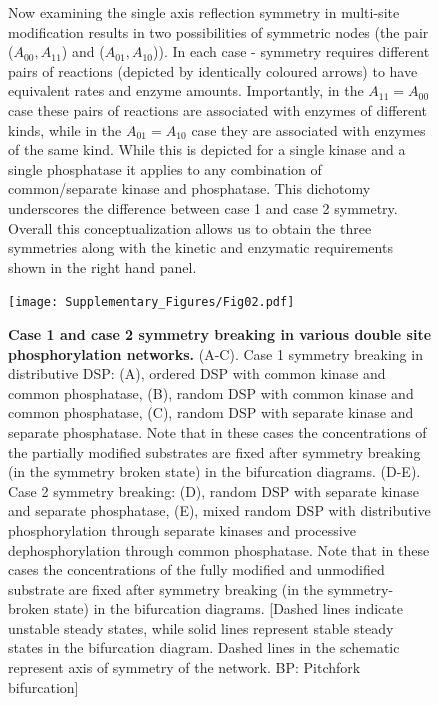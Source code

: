 \documentclass[16pt, a4paper]{article}
\begin{document}
\begin{figure}[ht!]
{        Now examining the single axis reflection symmetry in multi-site modification results in two possibilities of symmetric nodes (the pair ($A_{00},A_{11}$) and ($A_{01},A_{10}$)). In each case - symmetry requires different pairs of reactions (depicted by identically coloured arrows) to have equivalent rates and enzyme amounts. Importantly, in the $A_{11} = A_{00}$ case these pairs of reactions are associated with enzymes of different kinds, while in the $A_{01}=A_{10}$ case they are associated with enzymes of the same kind. While this is depicted for a single kinase and a single phosphatase it applies to any combination of common/separate kinase and phosphatase. This dichotomy underscores the difference between case 1 and case 2 symmetry. 
        Overall this conceptualization allows us to obtain the three symmetries along with the kinetic and enzymatic requirements shown in the right hand panel.}
        \label{Fig 1}
\end{figure}

\clearpage
\begin{figure}[h!]
    \centering
    \texttt{[image: Supplementary\_Figures/Fig02.pdf]}
    \caption{\textbf{Case 1 and case 2 symmetry breaking in various double site phosphorylation networks.}
    (A-C). Case 1 symmetry breaking in distributive  DSP: (A), ordered DSP with common kinase and common phosphatase, (B), random DSP with common kinase and common phosphatase, (C), random  DSP with separate kinase and separate phosphatase. Note that in these cases the concentrations of the partially modified substrates are fixed after symmetry breaking  (in the symmetry broken state) in the bifurcation diagrams.
    (D-E). Case 2 symmetry breaking: (D), random  DSP with separate kinase and separate phosphatase,  (E), mixed random DSP with distributive phosphorylation through separate kinases and processive dephosphorylation through common phosphatase. Note that in these cases the concentrations of the fully modified and unmodified substrate are fixed after symmetry breaking (in the symmetry-broken state) in the bifurcation diagrams.
    [Dashed lines indicate unstable steady states, while solid lines represent stable steady states in the bifurcation diagram. Dashed lines in the  schematic represent axis of symmetry of the network. BP: Pitchfork bifurcation]}
    \label{Fig 2}
\end{figure}
\end{document}
